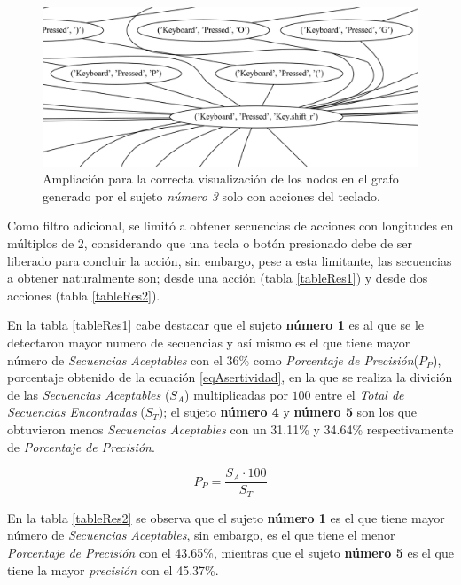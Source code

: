 \begin{figure}[h]
\centering
\includegraphics[width=1.0 \columnwidth]{chap5/Imagenes/MoreZKB150.eps}
\caption{Ampliaci\'on para la correcta visualizaci\'on de los nodos en el
 grafo generado por el sujeto \emph{n\'umero 3} solo con acciones del
 teclado.}
\label{fig:morezKB}
\end{figure}

\newpage

Como filtro adicional, se limit\'o a obtener secuencias de 
 acciones con longitudes en m\'ultiplos de 2, considerando que una tecla o 
 bot\'on presionado debe de ser liberado para concluir la acci\'on, sin 
 embargo, pese a esta limitante, las secuencias a obtener naturalmente son; 
 desde una acci\'on (tabla \ref{tableRes1}) y desde dos acciones (tabla 
 \ref{tableRes2}). 
 

En la tabla \ref{tableRes1} cabe destacar que el sujeto \textbf{n\'umero 1}
 es al que se le detectaron mayor numero de secuencias y as\'i mismo es el 
 que tiene mayor n\'umero de \emph{Secuencias Aceptables} con el 36\% como
 \emph{Porcentaje de Precisi\'on}($P_P$), porcentaje obtenido de la ecuaci\'on
 \ref{eqAsertividad}, en la que se realiza la divici\'on de las 
 \emph{Secuencias Aceptables} ($S_A$) multiplicadas por $100$ entre el 
 \emph{Total de Secuencias Encontradas} ($S_T$); el sujeto \textbf{n\'umero 
 4} y \textbf{n\'umero 5} son los que obtuvieron menos \emph{Secuencias
 Aceptables} con un 31.11\%  y 34.64\% respectivamente de \emph{Porcentaje
 de Precisi\'on}.


\begin{equation}
P_P = \dfrac{ S_A \cdot 100}{S_T}
\label{eqAsertividad}
\end{equation}
 
 
En la tabla \ref{tableRes2} se observa que el sujeto \textbf{n\'umero 1} es 
 el que tiene mayor n\'umero de \emph{Secuencias Aceptables}, sin embargo, 
 es el que tiene el menor \emph{Porcentaje de Precisi\'on} con el 43.65\%, 
 mientras que el sujeto \textbf{n\'umero 5} es el que tiene la mayor
 \emph{precisi\'on} con el 45.37\%.


